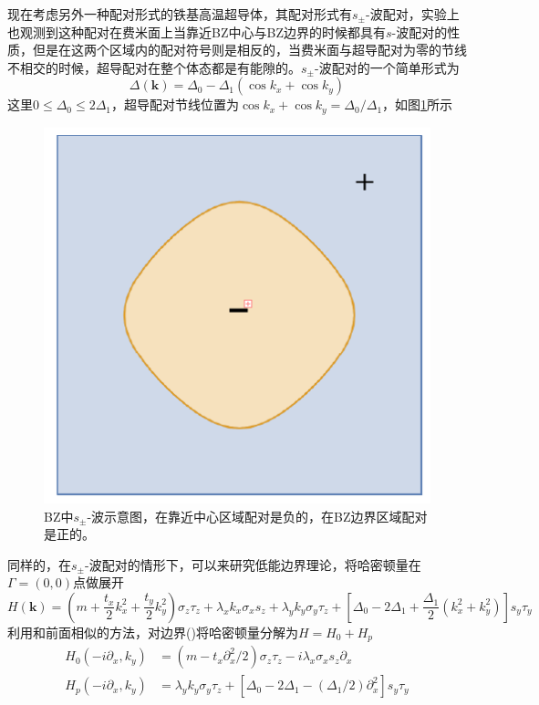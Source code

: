  现在考虑另外一种配对形式的铁基高温超导体，其配对形式有$s_\pm$-波配对，实验上也观测到这种配对在费米面上当靠近BZ中心与BZ边界的时候都具有$s$-波配对的性质，但是在这两个区域内的配对符号则是相反的，当费米面与超导配对为零的节线不相交的时候，超导配对在整个体态都是有能隙的。$s_\pm$-波配对的一个简单形式为
\begin{equation}
\Delta(\mathbf{k})=\Delta_0-\Delta_1(\cos k_x+\cos k_y)
\end{equation}
这里$0\le\Delta_0\le2\Delta_1$，超导配对节线位置为$\cos k_x+\cos k_y=\Delta_0/\Delta_1$，如图\ref{fig10}所示
\begin{figure}[h]
\centering
\includegraphics[scale=0.5]{pic/fig11.png}
\caption{BZ中$s_\pm$-波示意图，在靠近中心区域配对是负的，在BZ边界区域配对是正的。}\label{fig10}
\end{figure}
同样的，在$s_\pm$-波配对的情形下，可以来研究低能边界理论，将哈密顿量在$\Gamma=(0,0)$点做展开
\begin{equation}
H(\mathbf{k})=(m+\frac{t_x}{2}k_x^2+\frac{t_y}{2}k_y^2)\sigma_z\tau_z+\lambda_xk_x\sigma_xs_z+\lambda_yk_y\sigma_y\tau_z+\left[\Delta_0-2\Delta_1+\frac{\Delta_1}{2}(k_x^2+k_y^2)\right]s_y\tau_y\label{hoti2s}
\end{equation}
利用和前面相似的方法，对边界(\uppercase\expandafter{})将哈密顿量分解为$H=H_0+H_p$
\begin{equation}
\begin{aligned}
H_0(-i\partial_x,k_y)&=(m-t_x\partial_x^2/2)\sigma_z\tau_z-i\lambda_x\sigma_xs_z\partial_x\\
H_p(-i\partial_x,k_y)&=\lambda_yk_y\sigma_y\tau_z+\left[\Delta_0-2\Delta_1-(\Delta_1/2)\partial_x^2\right]s_y\tau_y
\end{aligned}
\end{equation}
